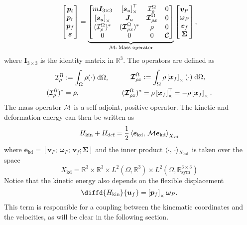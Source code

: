 \begin{equation}
\label{eq:mass_op}
\begin{bmatrix}
\bm{p}_t \\ \bm{p}_r \\ \bm{p}_f \\ \bm\varepsilon \\
\end{bmatrix} = 
\underbrace{\begin{bmatrix}
	m \bm{I}_{3\times 3} & \crmat{\bm{s}_u}^\top & \mathcal{I}_\rho^{\Omega} & 0 \\
	\crmat{\bm{s}_u} & \bm{J}_u & \bm{\mathcal{I}}_{\rho x}^{\Omega} & 0  \\
	(\mathcal{I}_\rho^{\Omega})^* & (\bm{\mathcal{I}}_{\rho x}^{\Omega})^* & \rho & 0  \\
	0 & 0 & 0 & \bm{\mathcal{C}} \\
	\end{bmatrix}}_{{\mathcal{M}}: \; \text{Mass operator}}
\begin{bmatrix}
\bm{v}_P \\ \bm{\omega}_P  \\ \bm{v}_f  \\ \bm\Sigma \\
\end{bmatrix},
\end{equation}
where $\bm{I}_{3\times 3}$ is the identity matrix in $\mathbb{R}^3$. The operators are defined as
\begin{equation*}
\begin{aligned}
\mathcal{I}_\rho^\Omega &:=\int_{\Omega} \rho (\cdot) \d{\Omega}, \\
(\mathcal{I}_\rho^{\Omega})^* &= \rho, \\
\end{aligned} \qquad
\begin{aligned} 
\bm{\mathcal{I}}_{\rho x}^{\Omega} &:= \int_\Omega \rho \crmat{\bm{x}_f} (\cdot) \d{\Omega}, \\
(\bm{\mathcal{I}}_{\rho x}^{\Omega})^* &= \rho \crmat{\bm{x}_f}^\top= -\rho \crmat{\bm{x}_f}. \\
\end{aligned}
\end{equation*}
The mass operator $\mathcal{M}$ is a self-adjoint, positive operator. The kinetic and deformation energy can then be written as
\begin{equation}
H_{\text{kin}} + H_{\text{def}} = \frac{1}{2} \inner[X_{\text{kd}}]{\bm{e}_{\text{kd}}}{{\mathcal{M}} \bm{e}_{\text{kd}}}
\end{equation}
where $\bm{e}_{\text{kd}} = [\bm{v}_P; \, \bm{\omega}_P; \, \bm{v}_f; \bm{\Sigma}]$ and the inner product $\inner[X_{\text{kd}}]{\cdot}{\cdot}$ is taken over the space 
$$ 	X_{\text{kd}} = \mathbb{R}^3 \times \mathbb{R}^3 \times {L}^2(\Omega, \mathbb{R}^3) \times {L}^2(\Omega, \mathbb{R}^{3\times 3}_{\text{sym}})$$ 
Notice that the kinetic energy also depends on the flexible displacement
\[
\diffd{H_{\text{kin}}}{\bm{u}_f} = \crmat{\bm{p}_f} \bm{\omega}_{P}.
\]
This term is responsible for a coupling between the kinematic coordinates and the velocities, as will be clear in the following section. 

